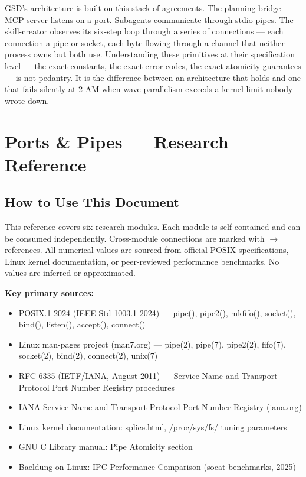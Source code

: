 \documentclass[11pt,letterpaper]{article}
\newcommand{\stageheader}[2]{%
  \noindent\colorbox{#2}{\makebox[\textwidth][l]{%
    \textcolor{white}{\bfseries\sffamily\hspace{6pt}#1\hspace{6pt}}}}%
  \vspace{0.5em}\par%
}
\begin{document}
GSD's architecture is built on this stack of agreements. The planning-bridge MCP server listens on a port. Subagents communicate through stdio pipes. The skill-creator observes its six-step loop through a series of connections --- each connection a pipe or socket, each byte flowing through a channel that neither process owns but both use. Understanding these primitives at their specification level --- the exact constants, the exact error codes, the exact atomicity guarantees --- is not pedantry. It is the difference between an architecture that holds and one that fails silently at 2 AM when wave parallelism exceeds a kernel limit nobody wrote down.

\newpage
\stageheader{STAGE 2 --- RESEARCH REFERENCE}{secondary}

\section{Ports \& Pipes --- Research Reference}

\subsection{How to Use This Document}

This reference covers six research modules. Each module is self-contained and can be consumed independently. Cross-module connections are marked with $\rightarrow$ references. All numerical values are sourced from official POSIX specifications, Linux kernel documentation, or peer-reviewed performance benchmarks. No values are inferred or approximated.

\textbf{Key primary sources:}
\begin{itemize}[leftmargin=1.5em]
  \item POSIX.1-2024 (IEEE Std 1003.1-2024) --- pipe(), pipe2(), mkfifo(), socket(), bind(), listen(), accept(), connect()
  \item Linux man-pages project (man7.org) --- pipe(2), pipe(7), pipe2(2), fifo(7), socket(2), bind(2), connect(2), unix(7)
  \item RFC 6335 (IETF/IANA, August 2011) --- Service Name and Transport Protocol Port Number Registry procedures
  \item IANA Service Name and Transport Protocol Port Number Registry (iana.org)
  \item Linux kernel documentation: splice.html, /proc/sys/fs/ tuning parameters
  \item GNU C Library manual: Pipe Atomicity section
  \item Baeldung on Linux: IPC Performance Comparison (socat benchmarks, 2025)
\end{itemize}
\end{document}
